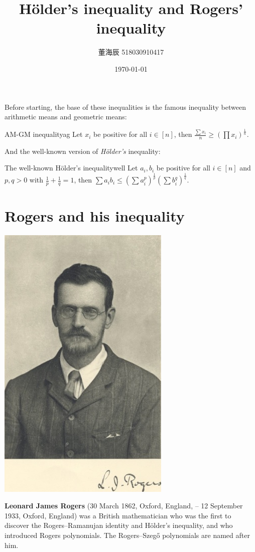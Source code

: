 

\title{Hölder's inequality and Rogers' inequality}
\date{\today}
\author{董海辰 518030910417}


\maketitle

\tableofcontents
\newpage

Before starting, the base of these inequalities is the famous inequality between arithmetic means and geometric means:
\begin{thm}{AM-GM inequality}{ag}
    Let $x_i$ be positive for all $i \in [n]$, then
    \begin{math}
        \frac{\sum x_i}{n} \ge (\prod x_i)^{\frac{1}{n}}
    .\end{math}
\end{thm}

And the well-known version of \textit{Hölder's} inequality:
\begin{thm}{The well-known Hölder's inequality}{well}
    Let $a_i, b_i$ be positive for all $i \in [n]$ and $p, q > 0$ with $\frac{1}{p} + \frac{1}{q} = 1$, then
    \begin{math}
        \sum a_i b_i \le (\sum a_i^p)^\frac{1}{p} (\sum b_i^q)^\frac{1}{q}
    .\end{math}
\end{thm}

\section{Rogers and his inequality}

\begin{qte}
    \begin{center}
        \includegraphics[height=0.4\textwidth]{Rogers.jpg}
    \end{center}
    \textbf{Leonard James Rogers} (30 March 1862, Oxford, England, – 12 September 1933, Oxford, England) was a British mathematician who was the first to discover the Rogers–Ramanujan identity and Hölder's inequality, and who introduced Rogers polynomials. The Rogers–Szegő polynomials are named after him.
\end{qte}

